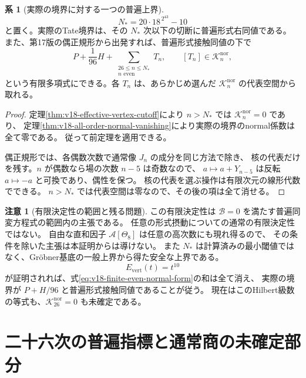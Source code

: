 \documentclass[a4paper,11pt]{ltjsarticle}
\theoremstyle{definition}
\newtheorem{remark}[theorem]{注意}
\newtheorem{corollary}[theorem]{系}
\begin{document}
\begin{corollary}[実際の境界に対する一つの普遍上界]
\label{cor:v18-explicit-finite-boundary}
\begin{equation}\label{eq:v18-explicit-finite-degree}
 N_* =20\cdot18^{\,2^{43}}-10
\end{equation}
と置く。実際のTate境界は、その $N_*$ 次以下の切断に普遍形式右同値である。
また、第17版の偶正規形から出発すれば、普遍形式接触同値の下で
\begin{equation}\label{eq:v18-finite-even-normal-form}
 P+\frac1{96}H+
 \sum_{\substack{26\le n\le N_*\\n\text{ even}}}T_n,
 \qquad [T_n]\in\mathcal K_n^{\mathrm{nor}},
\end{equation}
という有限多項式にできる。各 $T_n$ は、あらかじめ選んだ
$\mathcal K_n^{\mathrm{nor}}$ の代表空間から取れる。
\end{corollary}

\begin{proof}
定理\ref{thm:v18-effective-vertex-cutoff}により
$n>N_*$ では $\mathcal K_n^{\mathrm{nor}}=0$ であり、
定理\ref{thm:v18-all-order-normal-vanishing}により実際の境界のnormal係数は全て零である。
従って前定理を適用できる。

偶正規形では、各偶数次数で通常像 $J_n$ の成分を同じ方法で除き、
核の代表だけを残す。$n$ が偶数なら場の次数 $n-5$ は奇数なので、
$a\mapsto a+Y_{n-5}$ は反転 $a\mapsto-a$ と可換であり、偶性を保つ。
核の代表を選ぶ操作は有限次元の線形代数でできる。
$n>N_*$ では代表空間は零なので、その後の項は全て消せる。
\end{proof}

\begin{remark}[有限決定性の範囲と残る問題]
この有限決定性は $\mathcal B=0$ を満たす普遍同変方程式の範囲内の主張である。
任意の形式摂動についての通常の有限決定性ではない。
自由な直和因子 $\mathcal A[\Theta_8]$ は任意の高次数にも現れ得るので、
その条件を除いた主張は本証明からは導けない。
また $N_*$ は計算済みの最小閾値ではなく、Gr\"obner基底の一般上界から得た安全な上界である。
\[
 E_{\mathrm{vert}}(t)=t^{10}
\]
が証明されれば、式\eqref{eq:v18-finite-even-normal-form}の和は全て消え、
実際の境界が $P+H/96$ と普遍形式接触同値であることが従う。
現在はこのHilbert級数の等式も、$\mathcal K_{26}^{\mathrm{nor}}=0$ も未確定である。
\end{remark}



\section{二十六次の普遍指標と通常商の未確定部分}
\label{sec:v18-characters}
\end{document}
